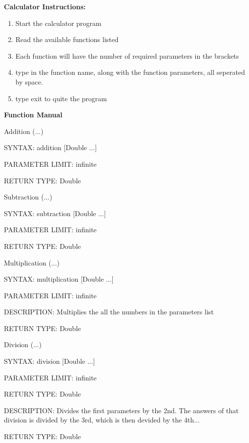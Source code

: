 \documentclass{article}
\begin{document}
\begin{flushleft}

\textbf{\Large Calculator Instructions:}

\begin{enumerate}
\item Start the calculator program 
\item Read the available functions listed
\item Each function will have the number of required parameters in the brackets 
\item type in the function name, along with the function parameters, all seperated by space.
\item type exit to quite the program
\end{enumerate}


\textbf{\Large Function Manual}

Addition (...)
\begin{compactitem}
  \item [] SYNTAX: addition [Double ...]
  \item [] PARAMETER LIMIT: infinite
  \item [] RETURN TYPE: Double
\end{compactitem}
\medskip

Subtraction (...)
\begin{compactitem}
  \item [] SYNTAX: subtraction [Double ...]
  \item [] PARAMETER LIMIT: infinite
  \item [] RETURN TYPE: Double
\end{compactitem}
\medskip

Multiplication (...)
\begin{compactitem}
  \item [] SYNTAX: multiplication [Double ...]
  \item [] PARAMETER LIMIT: infinite
  \item [] DESCRIPTION: Multiplies the all the numbers in the parameters list
  \item [] RETURN TYPE: Double
\end{compactitem}
\medskip

Division (...)
\begin{compactitem}
  \item [] SYNTAX: division [Double ...]
  \item [] PARAMETER LIMIT: infinite
  \item [] RETURN TYPE: Double
  \item [] DESCRIPTION: Divides the first parameters by the 2nd. The answers of 
               that division is divided by the 3rd, which is then 
	       devided by the 4th...
  \item [] RETURN TYPE: Double
\end{compactitem}
\medskip


\end{flushleft}
\end{document}

